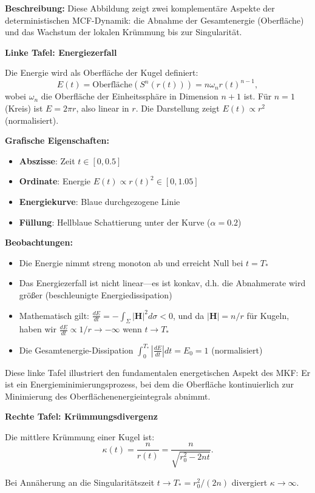 \documentclass[a4paper,12pt]{article}
\theoremstyle{definition}
\begin{document}
\textbf{Beschreibung:} Diese Abbildung zeigt zwei komplementäre Aspekte der deterministischen MCF-Dynamik: die Abnahme der Gesamtenergie (Oberfläche) und das Wachstum der lokalen Krümmung bis zur Singularität.

\textbf{Linke Tafel: Energiezerfall}

Die Energie wird als Oberfläche der Kugel definiert:
\[
E(t) = \text{Oberfläche}(S^n(r(t))) = n\omega_n r(t)^{n-1},
\]
wobei $\omega_n$ die Oberfläche der Einheitssphäre in Dimension $n+1$ ist. Für $n=1$ (Kreis) ist $E = 2\pi r$, also linear in $r$. Die Darstellung zeigt $E(t) \propto r^2$ (normalisiert).

\textbf{Grafische Eigenschaften:}
\begin{itemize}
	\item \textbf{Abszisse}: Zeit $t \in [0, 0.5]$
	\item \textbf{Ordinate}: Energie $E(t) \propto r(t)^2 \in [0, 1.05]$
	\item \textbf{Energiekurve}: Blaue durchgezogene Linie
	\item \textbf{Füllung}: Hellblaue Schattierung unter der Kurve ($\alpha = 0.2$)
\end{itemize}

\textbf{Beobachtungen:}
\begin{itemize}
	\item Die Energie nimmt streng monoton ab und erreicht Null bei $t = T_*$
	\item Das Energiezerfall ist nicht linear—es ist konkav, d.h. die Abnahmerate wird größer (beschleunigte Energiedissipation)
	\item Mathematisch gilt: $\frac{dE}{dt} = -\int_\Sigma |\mathbf{H}|^2 d\sigma < 0$, und da $|\mathbf{H}| = n/r$ für Kugeln, haben wir $\frac{dE}{dt} \propto 1/r \to -\infty$ wenn $t \to T_*$
	\item Die Gesamtenergie-Dissipation $\int_0^{T_*} |\frac{dE}{dt}| dt = E_0 = 1$ (normalisiert)
\end{itemize}

Diese linke Tafel illustriert den fundamentalen energetischen Aspekt des MKF: Er ist ein Energieminimierungsprozess, bei dem die Oberfläche kontinuierlich zur Minimierung des Oberflächenenergieintegrals abnimmt.

\textbf{Rechte Tafel: Krümmungsdivergenz}

Die mittlere Krümmung einer Kugel ist:
\[
\kappa(t) = \frac{n}{r(t)} = \frac{n}{\sqrt{r_0^2 - 2nt}}.
\]

Bei Annäherung an die Singularitätszeit $t \to T_* = r_0^2 / (2n)$ divergiert $\kappa \to \infty$.
\end{document}
